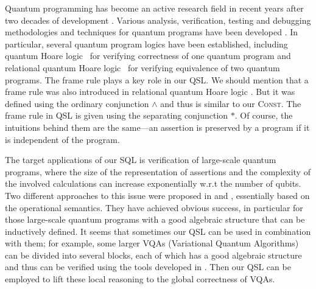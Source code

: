 \documentclass[conference,compsoc, 10pt]{IEEEtran}
\def\>{\ensuremath{\rangle}}
\begin{document}
	Quantum programming has become an active research field  in recent years after two decades of development \cite{HSM20}. Various analysis, verification, testing and debugging methodologies and techniques for quantum programs have been developed \cite{Ak05, DP06, BS04, BS06, BJ04, CMS06, Kak09, Ran16, FDJ07, YDF10, Ying16}. In particular, several quantum program logics have been established, including quantum Hoare logic~\cite{Ying11, Unr19b, ZYY19} for verifying correctness of one quantum program and relational quantum Hoare logic~\cite{Unr19a, BHY19, LU19} for verifying equivalence of two quantum programs.
The frame rule plays a key role in our QSL. We should mention that a frame rule
was also introduced in relational quantum Hoare logic  \cite{Unr19a, BHY19,
LU19}. But it was defined using the ordinary conjunction $\wedge$ and thus  is
similar to our \textsc{Const}. The frame rule in QSL is given using the
separating conjunction $\ast$. Of course, the intuitions behind them are the
same---an assertion is preserved by a program if it is independent of the program.
	
	The target applications of our SQL is verification of large-scale quantum programs, where the size of the representation   of assertions and the complexity of the involved  calculations can increase exponentially w.r.t the number of qubits. Two different approaches to this issue were proposed in \cite{HRS20} and \cite{Bor20}, essentially based  on the operational semantics. They have achieved obvious success, in particular for those  large-scale quantum programs with a good algebraic structure that can be  inductively defined. 
It seems that sometimes our QSL can be used in combination with  them; for example, some larger VQAs (Variational Quantum Algorithms) can be divided into several blocks,  each of which has a good algebraic structure and thus  can be verified using the tools developed in  \cite{HRS20,Bor20}. Then our QSL can be employed to lift these local reasoning to the 
global correctness of VQAs.
	
	
\end{document}
